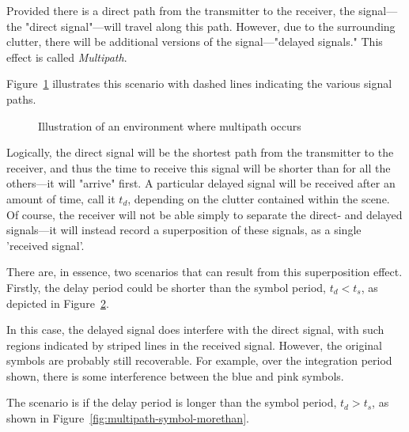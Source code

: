 \documentclass[class=report,11pt,crop=false]{standalone}
\begin{document}
Provided there is a direct path from the transmitter to the receiver, the signal---the "direct signal"---will travel along this path. However, due to the surrounding clutter, there will be additional versions of the signal---"delayed signals." This effect is called \emph{Multipath}.

Figure~\ref{fig:multipath-illustration} illustrates this scenario with dashed lines indicating the various signal paths.

\begin{figure}[htbp]
    \centering
    \def\svgwidth{\linewidth}
    { %
        }
    \caption{Illustration of an environment where multipath occurs}
    \label{fig:multipath-illustration}
\end{figure}

Logically, the direct signal will be the shortest path from the transmitter to the receiver, and thus the time to receive this signal will be shorter than for all the others---it will "arrive" first. A particular delayed signal will be received after an amount of time, call it \(t_d\), depending on the clutter contained within the scene. Of course, the receiver will not be able simply to separate the direct- and delayed signals---it will instead record a superposition of these signals, as a single 'received signal'.

There are, in essence, two scenarios that can result from this superposition effect. Firstly, the delay period could be shorter than the symbol period, \(t_d < t_s\), as depicted in Figure~\ref{fig:multipath-symbol-lessthan}.

\begin{figure}[htbp]
    \centering
    \def\svgwidth{\linewidth}
    { %
        }
    \caption{}
    \label{fig:multipath-symbol-lessthan}
\end{figure}

In this case, the delayed signal does interfere with the direct signal, with such regions indicated by striped lines in the received signal. However, the original symbols are probably still recoverable. For example, over the integration period shown, there is some interference between the blue and pink symbols.

The scenario is if the delay period is longer than the symbol period, \(t_d > t_s\), as shown in Figure~\ref{fig:multipath-symbol-morethan}.
\end{document}
